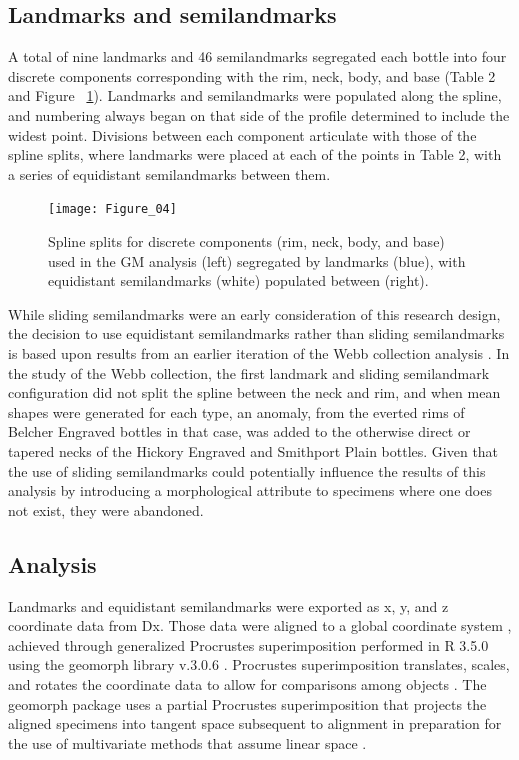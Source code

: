 \documentclass[article]{sa}
\begin{document}
\subsection*{Landmarks and semilandmarks}

A total of nine landmarks and 46 semilandmarks segregated each bottle into four discrete components corresponding with the rim, neck, body, and base (Table 2 and Figure ~\ref{fig:fig4}). Landmarks and semilandmarks were populated along the spline, and numbering always began on that side of the profile determined to include the widest point. Divisions between each component articulate with those of the spline splits, where landmarks were placed at each of the points in Table 2, with a series of equidistant semilandmarks between them.

\begin{figure}[ht]\centering
\texttt{[image: Figure\_04]}
\caption{Spline splits for discrete components (rim, neck, body, and base) used in the GM analysis (left) segregated by landmarks (blue), with equidistant semilandmarks (white) populated between (right).}
\label{fig:fig4}
\end{figure}

While sliding semilandmarks were an early consideration of this research design, the decision to use equidistant semilandmarks rather than sliding semilandmarks is based upon results from an earlier iteration of the Webb collection analysis \citep{RN11716}. In the study of the Webb collection, the first landmark and sliding semilandmark configuration did not split the spline between the neck and rim, and when mean shapes were generated for each type, an anomaly, from the everted rims of Belcher Engraved bottles in that case, was added to the otherwise direct or tapered necks of the Hickory Engraved and Smithport Plain bottles. Given that the use of sliding semilandmarks could potentially influence the results of this analysis by introducing a morphological attribute to specimens where one does not exist, they were abandoned.

\subsection*{Analysis}

Landmarks and equidistant semilandmarks were exported as x, y, and z coordinate data from Dx. Those data were aligned to a global coordinate system \citep{RN11622,RN11623,RN11563}, achieved through generalized Procrustes superimposition \citep{RN478} performed in R 3.5.0 \citep{RN477} using the geomorph library v.3.0.6 \citep{RN11530,RN1774}. Procrustes superimposition translates, scales, and rotates the coordinate data to allow for comparisons among objects \citep{RN11564,RN478}. The geomorph package uses a partial Procrustes superimposition that projects the aligned specimens into tangent space subsequent to alignment in preparation for the use of multivariate methods that assume linear space \citep{RN1646,RN11563}.
\end{document}
